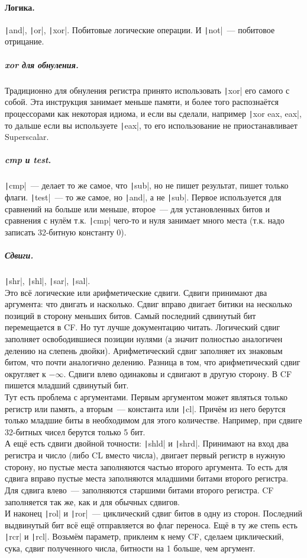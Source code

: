 \documentclass{article}
\begin{document}
    \paragraph{Логика.}
    \texttt|and|, \texttt|or|, \texttt|xor|. Побитовые логические операции. И \texttt|not|~--- побитовое отрицание.
    \subparagraph{xor для обнуления.}
    Традиционно для обнуления регистра принято использовать \texttt|xor| его самого с собой. Эта инструкция занимает меньше памяти, и более того распознаётся процессорами как некоторая идиома, и если вы сделали, например \texttt|xor eax, eax|, то дальше если вы используете \texttt|eax|, то его использование не приостанавливает Superscalar.
    \subparagraph{cmp и test.}
    \texttt|cmp|~--- делает то же самое, что \texttt|sub|, но не пишет результат, пишет только флаги. \texttt|test|~--- то же самое, но \texttt|and|, а не \texttt|sub|. Первое используется для сравнений на больше или меньше, второе~--- для установленных битов и сравнения с нулём т.к. \texttt|cmp| чего-то и нуля занимает много места (т.к. надо записать 32-битную константу 0).
    \subparagraph{Сдвиги.}
    \texttt|shr|, \texttt|shl|, \texttt|sar|, \texttt|sal|.\\
    Это всё логические или арифметические сдвиги. Сдвиги принимают два аргумента: что двигать и насколько. Сдвиг вправо двигает битики на несколько позиций в сторону меньших битов. Самый последний сдвинутый бит перемещается в CF. Но тут лучше документацию читать. Логический сдвиг заполняет освободившиеся позиции нулями (а значит полностью аналогичен делению на слепень двойки). Арифметический сдвиг заполняет их знаковым битом, что почти аналогично делению. Разница в том, что арифметический сдвиг округляет к $-\infty$. Сдвиги влево одинаковы и сдвигают в другую сторону. В CF пишется младший сдвинутый бит.\\
    Тут есть проблема с аргументами. Первым аргументом может являться только регистр или память, а вторым~--- константа или \texttt|cl|. Причём из него берутся только младшие биты в необходимом для этого количестве. Например, при сдвиге 32-битных чисел берутся только 5 бит.\\
    А ещё есть сдвиги двойной точности: \texttt|shld| и \texttt|shrd|. Принимают на вход два регистра и число (либо CL вместо числа), двигает первый регистр в нужную сторону, но пустые места заполняются частью второго аргумента. То есть для сдвига вправо пустые места заполняются младшими битами второго регистра. Для сдвига влево~--- заполняются старшими битами второго регистра. CF заполняется так же, как и для обычных сдвигов.\\
    И наконец \texttt|rol| и \texttt|ror|~--- циклический сдвиг битов в одну из сторон. Последний выдвинутый бит всё ещё отправляется во флаг переноса. Ещё в ту же степь есть \texttt|rcr| и \texttt|rcl|. Возьмём параметр, приклеим к нему CF, сделаем циклический, сука, сдвиг полученного числа, битности на 1 больше, чем аргумент.
\end{document}
